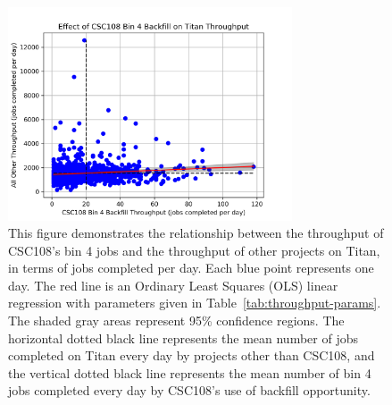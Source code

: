\begin{figure}
  \includegraphics[width=0.75\textwidth]{images/linfit-throughput-bin4.png}
\caption{This figure demonstrates the relationship between the throughput of
CSC108's bin 4 jobs and the throughput of other projects on Titan, in terms of
jobs completed per day. Each blue point represents one day. The red line is an
Ordinary Least Squares (OLS) linear regression with parameters given in
Table~\ref{tab:throughput-params}. The shaded gray areas represent 95\%
confidence regions. The horizontal dotted black line represents the mean number
of jobs completed on Titan every day by projects other than CSC108, and the
vertical dotted black line represents the mean number of bin 4 jobs completed
every day by CSC108's use of backfill opportunity.}
\label{fig:throughput-bin4}
\end{figure}

